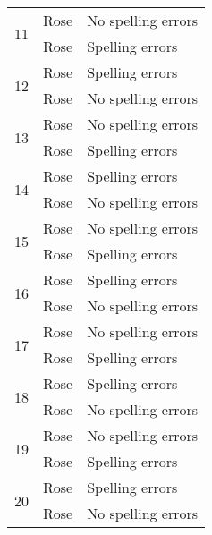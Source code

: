 \begin{table}[!ht]
\begin{center}
\begin{tabular}[center]{| l | l | l |}
         \hline \hline
         \multirow{2}{*}{11} & Rose & No spelling errors \\
                             & Rose & Spelling errors \\
         \hline
         \multirow{2}{*}{12} & Rose & Spelling errors \\
                             & Rose & No spelling errors \\
         \hline
         \multirow{2}{*}{13} & Rose & No spelling errors \\
                             & Rose & Spelling errors \\
         \hline
         \multirow{2}{*}{14} & Rose & Spelling errors \\
                             & Rose & No spelling errors \\
         \hline
         \multirow{2}{*}{15} & Rose & No spelling errors \\
                             & Rose & Spelling errors \\
         \hline
         \multirow{2}{*}{16} & Rose & Spelling errors \\
                             & Rose & No spelling errors \\
         \hline
         \multirow{2}{*}{17} & Rose & No spelling errors \\
                             & Rose & Spelling errors \\
         \hline
         \multirow{2}{*}{18} & Rose & Spelling errors \\
                             & Rose & No spelling errors \\
         \hline
         \multirow{2}{*}{19} & Rose & No spelling errors \\
                             & Rose & Spelling errors \\
         \hline
         \multirow{2}{*}{20} & Rose & Spelling errors \\
                             & Rose & No spelling errors \\
         \hline
      \end{tabular}
      \label{schedule}
   \end{center}
\end{table}
